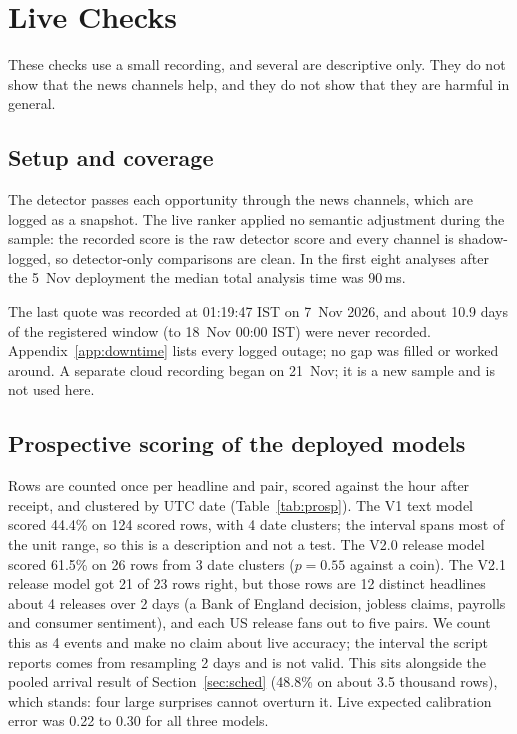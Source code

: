 \documentclass[conference]{IEEEtran}
\begin{document}
\section{Live Checks}\label{sec:live}
These checks use a small recording, and several are descriptive only. They do not show that the
news channels help, and they do not show that they are harmful in general.

\subsection{Setup and coverage}
The detector passes each opportunity through the news channels, which are logged as a snapshot.
The live ranker applied no semantic adjustment during the sample: the recorded score is the raw
detector score and every channel is shadow-logged, so detector-only comparisons are clean. In the
first eight analyses after the 5~Nov deployment the median total analysis time was 90\,ms.

The last quote was recorded at 01:19:47 IST on 7~Nov 2026, and about 10.9 days of the registered
window (to 18~Nov 00:00 IST) were never recorded. Appendix~\ref{app:downtime} lists every logged
outage; no gap was filled or worked around. A separate cloud recording began on 21~Nov; it is a
new sample and is not used here.

\subsection{Prospective scoring of the deployed models}
Rows are counted once per headline and pair, scored against the hour after receipt, and clustered
by UTC date (Table~\ref{tab:prosp}). The V1 text model scored 44.4\% on 124 scored rows, with 4
date clusters; the interval spans most of the unit range, so this is a description and not a test.
The V2.0 release model scored 61.5\% on 26 rows from 3 date clusters ($p=0.55$ against a coin).
The V2.1 release model got 21 of 23 rows right, but those rows are 12 distinct headlines about 4
releases over 2 days (a Bank of England decision, jobless claims, payrolls and consumer sentiment),
and each US release fans out to five pairs. We count this as 4 events and make no claim about live
accuracy; the interval the script reports comes from resampling 2 days and is not valid. This
sits alongside the pooled arrival result of Section~\ref{sec:sched} (48.8\% on about 3.5 thousand
rows), which stands: four large surprises cannot overturn it. Live expected calibration error was 0.22
to 0.30 for all three models.
\end{document}
